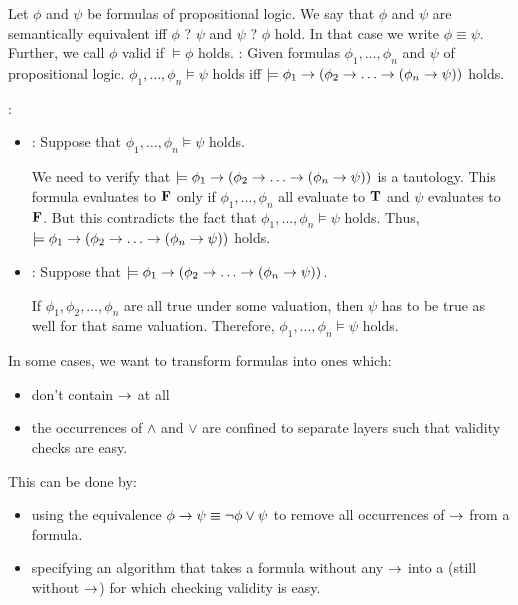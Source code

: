     \par Let $\phi$ and $\psi$ be formulas of propositional logic. We say that $\phi$ and $\psi$ are semantically equivalent iff $\phi$ ? $\psi$ and $\psi$ ? $\phi$ hold. In that case we write $\phi \equiv \psi$. Further, we call $\phi$ valid if $\models \phi$ holds.
    :  Given formulas $\phi_1, \ldots, \phi_n$ and $\psi$ of propositional logic. $\phi_1, \ldots, \phi_n \models \psi$ holds iff $\models \phi_1 \rightarrow (\phi_2 \rightarrow \ldots \rightarrow (\phi_n \rightarrow \psi))$ holds.

    \par {}:
      \begin{itemize}
        \item {}: Suppose that $\phi_1, \ldots, \phi_n \models \psi$ holds.
          \par We need to verify that $\models \phi_1 \rightarrow (\phi_2 \rightarrow \ldots \rightarrow (\phi_n \rightarrow \psi))$ is a tautology. This formula evaluates to $\mathbf{F}$ only if $\phi_1, \ldots, \phi_n$ all evaluate to $\mathbf{T}$ and $\psi$ evaluates to $\mathbf{F}$. But this contradicts the fact that $\phi_1, \ldots, \phi_n \models \psi$ holds. Thus, $\models \phi_1 \rightarrow (\phi_2 \rightarrow \ldots \rightarrow (\phi_n \rightarrow \psi))$ holds.
        \item {}: Suppose that $\models \phi_1 \rightarrow (\phi_2 \rightarrow \ldots \rightarrow (\phi_n \rightarrow \psi))$.
          \par If $\phi_1 ,\phi_2, \ldots, \phi_n$ are all true under some valuation, then $\psi$ has to be true as well for that same valuation. Therefore, $\phi_1, \ldots, \phi_n \models \psi$ holds.
      \end{itemize}

    \par In some cases, we want to transform formulas into ones which:
      \begin{itemize}
        \item don't contain $\rightarrow$ at all
        \item the occurrences of $\land$ and $\lor$ are confined to separate layers such that validity checks are easy.
      \end{itemize}

    \par This can be done by:
    \begin{itemize}
      \item using the equivalence $\phi \rightarrow \psi \equiv \lnot \phi \lor \psi$ to remove all occurrences of $\rightarrow$ from a formula.
      \item specifying an algorithm that takes a formula without any $\rightarrow$ into a  (still without $\rightarrow$) for which checking validity is easy.
    \end{itemize}

